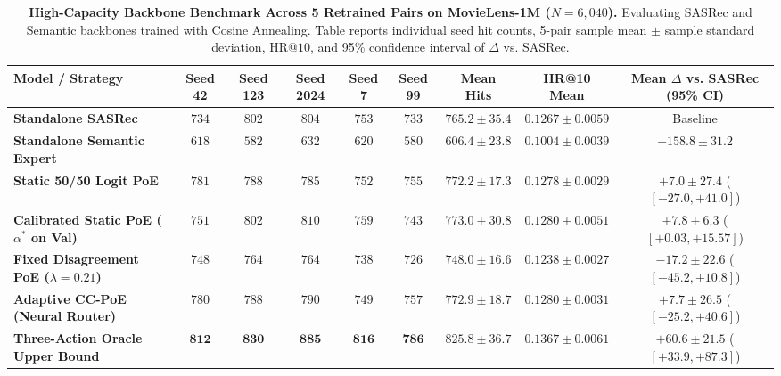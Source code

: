 \begin{table}[t]
\centering
\small
\caption{\textbf{High-Capacity Backbone Benchmark Across 5 Retrained Pairs on MovieLens-1M ($N=6{,}040$).} Evaluating SASRec and Semantic backbones trained with Cosine Annealing. Table reports individual seed hit counts, 5-pair sample mean $\pm$ sample standard deviation, $\text{HR@10}$, and 95\% confidence interval of $\Delta$ vs. SASRec.}
\label{tab:high_capacity_benchmark}
\begin{tabular}{lcccccccc}
\toprule
\textbf{Model / Strategy} & \textbf{Seed 42} & \textbf{Seed 123} & \textbf{Seed 2024} & \textbf{Seed 7} & \textbf{Seed 99} & \textbf{Mean Hits} & \textbf{HR@10 Mean} & \textbf{Mean $\Delta$ vs. SASRec (95\% CI)} \\
\midrule
\textbf{Standalone SASRec} & $734$ & $802$ & $804$ & $753$ & $733$ & $765.2 \pm 35.4$ & $0.1267 \pm 0.0059$ & Baseline \\
\textbf{Standalone Semantic Expert} & $618$ & $582$ & $632$ & $620$ & $580$ & $606.4 \pm 23.8$ & $0.1004 \pm 0.0039$ & $-158.8 \pm 31.2$ \\
\midrule
\textbf{Static 50/50 Logit PoE} & $781$ & $788$ & $785$ & $752$ & $755$ & $772.2 \pm 17.3$ & $0.1278 \pm 0.0029$ & $+7.0 \pm 27.4$ ($[-27.0, +41.0]$) \\
\textbf{Calibrated Static PoE ($\alpha^*$ on Val)} & $751$ & $802$ & $810$ & $759$ & $743$ & $\mathbf{773.0 \pm 30.8}$ & $\mathbf{0.1280 \pm 0.0051}$ & $\mathbf{+7.8 \pm 6.3}$ ($[+0.03, +15.57]$) \\
\textbf{Fixed Disagreement PoE ($\lambda=0.21$)} & $748$ & $764$ & $764$ & $738$ & $726$ & $748.0 \pm 16.6$ & $0.1238 \pm 0.0027$ & $\mathbf{-17.2 \pm 22.6}$ ($[-45.2, +10.8]$) \\
\textbf{Adaptive CC-PoE (Neural Router)} & $780$ & $788$ & $790$ & $749$ & $757$ & $772.9 \pm 18.7$ & $0.1280 \pm 0.0031$ & $+7.7 \pm 26.5$ ($[-25.2, +40.6]$) \\
\midrule
\textbf{Three-Action Oracle Upper Bound} & $\mathbf{812}$ & $\mathbf{830}$ & $\mathbf{885}$ & $\mathbf{816}$ & $\mathbf{786}$ & $\mathbf{825.8 \pm 36.7}$ & $\mathbf{0.1367 \pm 0.0061}$ & $\mathbf{+60.6 \pm 21.5}$ ($[+33.9, +87.3]$) \\
\bottomrule
\end{tabular}
\end{table}

